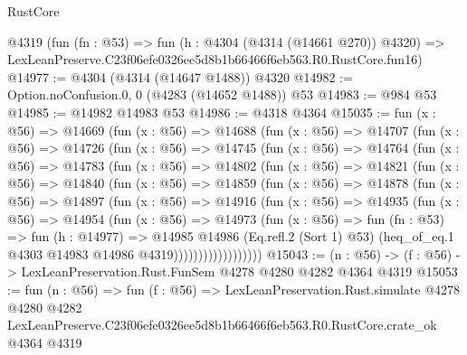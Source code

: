 \begin{lexlean}{RustCore}
\begin{coremodule}
    @4319
    (fun (fn : @53) =>
    fun (h : @4304 (@4314 (@14661 @270)) @4320) =>
    LexLeanPreserve.C23f06efe0326ee5d8b1b66466f6eb563.R0.RustCore.fun16)
@14977 := @4304 (@4314 (@14647 @1488)) @4320
@14982 := Option.noConfusion.{0, 0} (@4283 (@14652 @1488)) @53
@14983 := @984 @53
@14985 := @14982 @14983 @53
@14986 := @4318 @4364
@15035 := fun (x : @56) =>
  @14669
    (fun (x : @56) =>
    @14688
      (fun (x : @56) =>
      @14707
        (fun (x : @56) =>
        @14726
          (fun (x : @56) =>
          @14745
            (fun (x : @56) =>
            @14764
              (fun (x : @56) =>
              @14783
                (fun (x : @56) =>
                @14802
                  (fun (x : @56) =>
                  @14821
                    (fun (x : @56) =>
                    @14840
                      (fun (x : @56) =>
                      @14859
                        (fun (x : @56) =>
                        @14878
                          (fun (x : @56) =>
                          @14897
                            (fun (x : @56) =>
                            @14916
                              (fun (x : @56) =>
                              @14935
                                (fun (x : @56) =>
                                @14954
                                  (fun (x : @56) =>
                                  @14973
                                    (fun (x : @56) =>
                                    fun (fn : @53) =>
                                    fun (h : @14977) =>
                                    @14985
                                      @14986
                                      (Eq.refl.{2} (Sort 1) @53)
                                      (heq_of_eq.{1} @4303 @14983 @14986 @4319))))))))))))))))))
@15043 := (n : @56) -> (f : @56) -> LexLeanPreservation.Rust.FunSem @4278 @4280 @4282 @4364 @4319
@15053 := fun (n : @56) =>
  fun (f : @56) =>
  LexLeanPreservation.Rust.simulate
    @4278
    @4280
    @4282
    LexLeanPreserve.C23f06efe0326ee5d8b1b66466f6eb563.R0.RustCore.crate_ok
    @4364
    @4319
\end{coremodule}
\end{lexlean}
